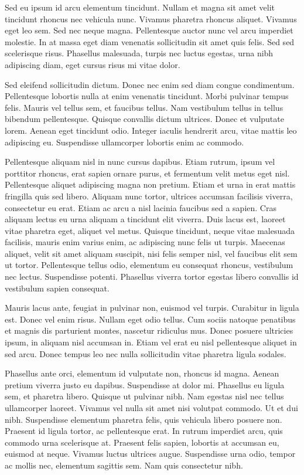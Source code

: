 Sed eu ipsum id arcu elementum tincidunt. Nullam et magna sit amet velit tincidunt rhoncus nec vehicula nunc. Vivamus
pharetra rhoncus aliquet. Vivamus eget leo sem. Sed nec neque magna. Pellentesque auctor nunc vel arcu imperdiet
molestie. In at massa eget diam venenatis sollicitudin sit amet quis felis. Sed sed scelerisque risus. Phasellus
malesuada, turpis nec luctus egestas, urna nibh adipiscing diam, eget cursus risus mi vitae dolor.

Sed eleifend sollicitudin dictum. Donec nec enim sed diam congue condimentum. Pellentesque lobortis nulla at enim
venenatis tincidunt. Morbi pulvinar tempus felis. Mauris vel tellus sem, et faucibus tellus. Nam vestibulum tellus in
tellus bibendum pellentesque. Quisque convallis dictum ultrices. Donec et vulputate lorem. Aenean eget tincidunt odio.
Integer iaculis hendrerit arcu, vitae mattis leo adipiscing eu. Suspendisse ullamcorper lobortis enim ac commodo.

Pellentesque aliquam nisl in nunc cursus dapibus. Etiam rutrum, ipsum vel porttitor rhoncus, erat sapien ornare purus,
et fermentum velit metus eget nisl. Pellentesque aliquet adipiscing magna non pretium. Etiam et urna in erat mattis
fringilla quis sed libero. Aliquam nunc tortor, ultrices accumsan facilisis viverra, consectetur eu erat. Etiam ac arcu
a nisl lacinia faucibus sed a sapien. Cras aliquam lectus eu urna aliquam a tincidunt elit viverra. Duis lacus est,
laoreet vitae pharetra eget, aliquet vel metus. Quisque tincidunt, neque vitae malesuada facilisis, mauris enim varius
enim, ac adipiscing nunc felis ut turpis. Maecenas aliquet, velit sit amet aliquam suscipit, nisi felis semper nisl, vel
faucibus elit sem ut tortor. Pellentesque tellus odio, elementum eu consequat rhoncus, vestibulum nec lectus.
Suspendisse potenti. Phasellus viverra tortor egestas libero convallis id vestibulum sapien consequat.

Mauris lacus ante, feugiat in pulvinar non, euismod vel turpis. Curabitur in ligula est. Donec vel enim risus. Nullam
eget odio tellus. Cum sociis natoque penatibus et magnis dis parturient montes, nascetur ridiculus mus. Donec posuere
ultricies ipsum, in aliquam nisl accumsan in. Etiam vel erat eu nisl pellentesque aliquet in sed arcu. Donec tempus leo
nec nulla sollicitudin vitae pharetra ligula sodales.

Phasellus ante orci, elementum id vulputate non, rhoncus id magna. Aenean pretium viverra justo eu dapibus. Suspendisse
at dolor mi. Phasellus eu ligula sem, et pharetra libero. Quisque ut pulvinar nibh. Nam egestas nisl nec tellus
ullamcorper laoreet. Vivamus vel nulla sit amet nisi volutpat commodo. Ut et dui nibh. Suspendisse elementum pharetra
felis, quis vehicula libero posuere non. Praesent id ligula tortor, ac pellentesque erat. In rutrum imperdiet arcu, quis
commodo urna scelerisque at. Praesent felis sapien, lobortis at accumsan eu, euismod at neque. Vivamus luctus ultrices
augue. Suspendisse urna odio, tempor ac mollis nec, elementum sagittis sem. Nam quis consectetur nibh.

